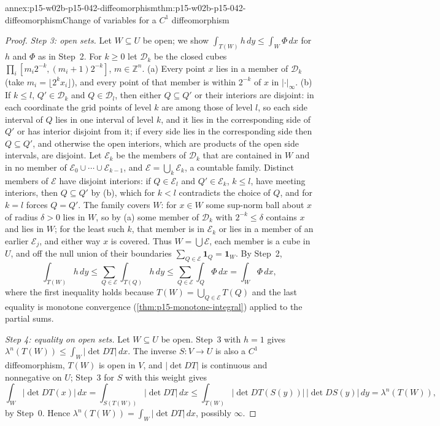 \begin{annexitem}{annex:p15-w02b-p15-042-diffeomorphism}{thm:p15-w02b-p15-042-diffeomorphism}{Change of variables for a \(C^1\) diffeomorphism}
\begin{proof}
\emph{Step 3: open sets.} Let \(W\subseteq U\) be open; we show
\(\int_{T(W)}h\,dy\leq\int_W\Phi\,dx\) for \(h\) and \(\Phi\) as in Step~2.
For \(k\geq0\) let \(\mathcal D_k\) be the closed cubes
\(\prod_i[m_i2^{-k},(m_i+1)2^{-k}]\), \(m\in\mathbb Z^n\). (a) Every point
\(x\) lies in a member of \(\mathcal D_k\) (take
\(m_i=\lfloor2^kx_i\rfloor\)), and every point of that member is within
\(2^{-k}\) of \(x\) in \(|\cdot|_\infty\). (b) If \(k\leq l\),
\(Q'\in\mathcal D_k\) and \(Q\in\mathcal D_l\), then either \(Q\subseteq Q'\)
or their interiors are disjoint: in each coordinate the grid points of level
\(k\) are among those of level \(l\), so each side interval of \(Q\) lies in
one interval of level \(k\), and it lies in the corresponding side of \(Q'\)
or has interior disjoint from it; if every side lies in the corresponding
side then \(Q\subseteq Q'\), and otherwise the open interiors, which are
products of the open side intervals, are disjoint. Let \(\mathcal E_k\) be
the members of \(\mathcal D_k\) that are contained in \(W\) and in no member
of \(\mathcal E_0\cup\cdots\cup\mathcal E_{k-1}\), and
\(\mathcal E=\bigcup_k\mathcal E_k\), a countable family. Distinct members
of \(\mathcal E\) have disjoint interiors: if \(Q\in\mathcal E_l\) and
\(Q'\in\mathcal E_k\), \(k\leq l\), have meeting interiors, then
\(Q\subseteq Q'\) by (b), which for \(k<l\) contradicts the choice of
\(Q\), and for \(k=l\) forces \(Q=Q'\). The family covers \(W\): for
\(x\in W\) some sup-norm ball about \(x\) of radius \(\delta>0\) lies in
\(W\), so by (a) some member of \(\mathcal D_k\) with \(2^{-k}\leq\delta\)
contains \(x\) and lies in \(W\); for the least such \(k\), that member is in
\(\mathcal E_k\) or lies in a member of an earlier \(\mathcal E_j\), and
either way \(x\) is covered. Thus \(W=\bigcup\mathcal E\), each member is a
cube in \(U\), and off the null union of their boundaries
\(\sum_{Q\in\mathcal E}\mathbf 1_Q=\mathbf 1_W\). By Step~2,
\[
 \int_{T(W)}h\,dy\leq\sum_{Q\in\mathcal E}\int_{T(Q)}h\,dy
   \leq\sum_{Q\in\mathcal E}\int_Q\Phi\,dx=\int_W\Phi\,dx ,
\]
where the first inequality holds because \(T(W)=\bigcup_{Q\in\mathcal E}T(Q)\)
and the last equality is monotone convergence
(\cref{thm:p15-monotone-integral}) applied to the partial sums.

\emph{Step 4: equality on open sets.} Let \(W\subseteq U\) be open. Step~3
with \(h=1\) gives \(\lambda^n(T(W))\leq\int_W|\det DT|\,dx\). The inverse
\(S:V\to U\) is also a \(C^1\) diffeomorphism, \(T(W)\) is open in \(V\),
and \(|\det DT|\) is continuous and nonnegative on \(U\); Step~3 for \(S\)
with this weight gives
\[
 \int_W|\det DT(x)|\,dx=\int_{S(T(W))}|\det DT|\,dx
  \leq\int_{T(W)}|\det DT(S(y))|\,|\det DS(y)|\,dy=\lambda^n(T(W)),
\]
by Step~0. Hence \(\lambda^n(T(W))=\int_W|\det DT|\,dx\), possibly
\(\infty\).


\end{proof}
\end{annexitem}
